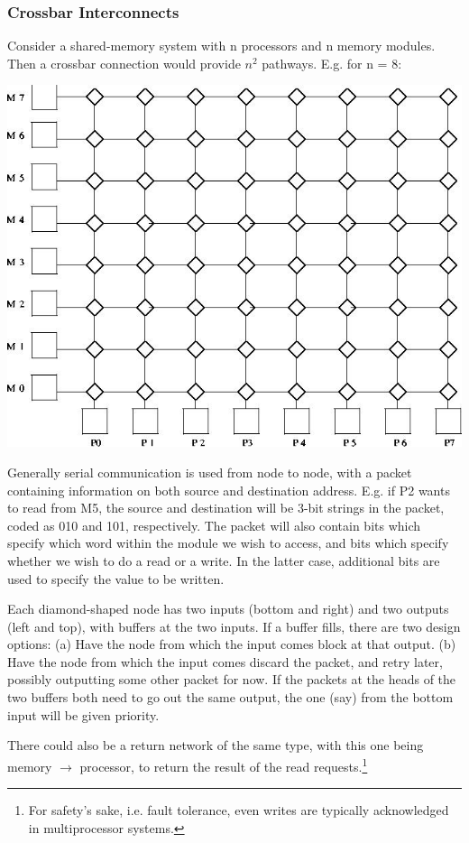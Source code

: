 \subsubsection{Crossbar Interconnects}

Consider a shared-memory system with n processors and n memory modules.
Then a crossbar connection would provide \( n^{2} \) pathways. E.g. for n =
8:

\includegraphics{Images/XBar.jpg} 

Generally serial communication is used from node to node, with a packet
containing information on both source and destination address. E.g. if
P2 wants to read from M5, the source and destination will be 3-bit
strings in the packet, coded as 010 and 101, respectively.  The packet
will also contain bits which specify which word within the module we
wish to access, and bits which specify whether we wish to do a read or a
write.  In the latter case, additional bits are used to specify the
value to be written.

Each diamond-shaped node has two inputs (bottom and right) and two
outputs (left and top), with buffers at the two inputs.  If a buffer
fills, there are two design options: (a) Have the node from which the
input comes block at that output. (b) Have the node from which the input
comes discard the packet, and retry later, possibly outputting some
other packet for now.  If the packets at the heads of the two buffers
both need to go out the same output, the one (say) from the bottom input
will be given priority.

There could also be a return network of the same type, with this one
being memory \( \rightarrow  \) processor, to return the result of the
read requests.\footnote{For safety's sake, i.e. fault tolerance, even
writes are typically acknowledged in multiprocessor systems.}

